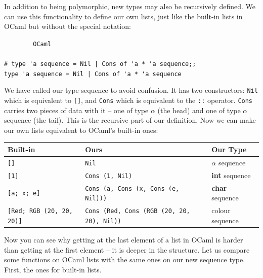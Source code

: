 \documentclass[]{book}
\newcommand\upquote[1]{\textquotesingle#1\textquotesingle}
\newcommand{\smspace}{\vspace{4mm}}
\begin{document}
In addition to being polymorphic, new types may also be recursively defined. We can use this functionality to define our own lists, just like the built-in lists in OCaml but without the special notation:

\smspace
\noindent\verb!        OCaml!\\
\noindent\\
\noindent\verb!# type 'a sequence = Nil | Cons of 'a * 'a sequence;;!\\
\noindent\verb!type 'a sequence = Nil | Cons of 'a * 'a sequence!
\smspace

\noindent We have called our type \textrm{sequence} to avoid confusion. It has two constructors: \texttt{Nil} which is equivalent to \texttt{[]}, and \texttt{Cons} which is equivalent to the \texttt{::} operator. \texttt{Cons} carries two pieces of data with it -- one of type $\alpha$ (the head) and one of type \textrm{$\alpha$ sequence} (the tail). This is the recursive part of our definition. Now we can make our own lists equivalent to OCaml's built-in ones:

\smspace
\noindent\begin{tabular}{@{}lll@{}} \toprule
  Built-in & Ours & Our Type\\ \midrule
  \texttt{[]} & \texttt{Nil} & $\alpha$ \textrm{sequence}\\
  \texttt{[1]} & \texttt{Cons (1, Nil)} & \textbf{\textrm{int}} \textrm{sequence}\\
  \texttt{[\upquote{a}; \upquote{x}; \upquote{e}]} & \texttt{Cons (\upquote{a}, Cons (\upquote{x}, Cons (\upquote{e}, Nil)))} & \textbf{\textrm{char}} \textrm{sequence}\\
  \texttt{[Red; RGB (20, 20, 20)]} & \texttt{Cons (Red, Cons (RGB (20, 20, 20),
Nil))} & \textrm{colour sequence} \\ \bottomrule
\end{tabular}
\smspace

\noindent Now you can see why getting at the last element of a list in OCaml is harder than getting at the first element -- it is deeper in the structure. Let us compare some functions on OCaml lists with the same ones on our new \textrm{sequence} type. First, the ones for built-in lists.
\end{document}
